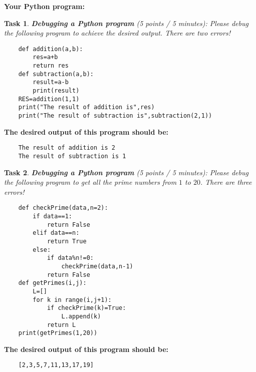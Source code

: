 \documentclass[UTF8]{ctexart}
\newtheorem{task}{Task}
\begin{document}
\noindent
\textbf{Your Python program:}
\vspace{6cm}


\newpage

\begin{task}
{\textbf{Debugging a Python program}} (5 points / 5 minutes): Please debug the following program to achieve the desired output. There are two errors!
\end{task}

\begin{verbatim}
    def addition(a,b):
        res=a+b
        return res
    def subtraction(a,b):
        result=a-b
        print(result)
    RES=addition(1,1)
    print("The result of addition is",res)
    print("The result of subtraction is",subtraction(2,1))
\end{verbatim}
\textbf{The desired output of this program should be:}
\begin{verbatim}
    The result of addition is 2
    The result of subtraction is 1
\end{verbatim}

\vspace{1cm}


\begin{task}
{\textbf{Debugging a Python program}} (5 points / 5 minutes): Please debug the following program to get all the prime numbers from $1$ to $20$. There are three errors!
\end{task}
\begin{verbatim}
    def checkPrime(data,n=2):
        if data==1:
            return False
        elif data==n:
            return True
        else:
            if data%n!=0:
                checkPrime(data,n-1)
            return False
    def getPrimes(i,j):
        L=[]
        for k in range(i,j+1):
            if checkPrime(k)=True:
                L.append(k)
            return L
    print(getPrimes(1,20))
\end{verbatim}
\textbf{The desired output of this program should be:}
\begin{verbatim}
    [2,3,5,7,11,13,17,19]
\end{verbatim}
\end{document}
